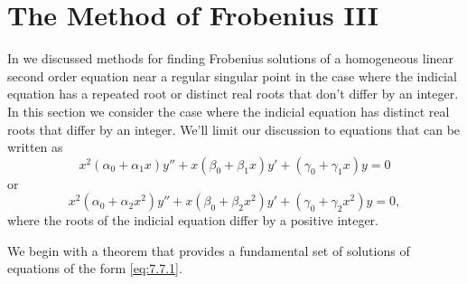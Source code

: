 \section{The Method of Frobenius III}\label{sec:frobenius_iii}

In  we discussed methods
for finding
Frobenius solutions of a homogeneous linear second order equation near
a regular singular point in the case where the indicial equation has a
repeated root or distinct real roots that don't differ by an integer.
In this section we consider the case where the indicial equation has
distinct real roots that differ by an integer. We'll limit our
discussion to equations that can be written as
\begin{equation} \label{eq:7.7.1}
x^2(\alpha_0+\alpha_1x)y''+x(\beta_0+\beta_1x)y'
+(\gamma_0+\gamma_1x)y=0
\end{equation}
or
\[
x^2(\alpha_0+\alpha_2x^2)y''+x(\beta_0+\beta_2x^2)y'
+(\gamma_0+\gamma_2x^2)y=0,
\]
where the roots of the indicial equation differ by a positive integer.

We begin with a theorem that provides a fundamental set of solutions
of equations of the form \eqref{eq:7.7.1}.


